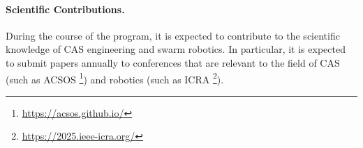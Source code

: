 \documentclass[12pt]{article}
\begin{document}
\paragraph{Scientific Contributions.}
During the course of the program, it is expected to contribute to the scientific knowledge of CAS engineering and swarm robotics. 
In particular, it is expected to submit papers annually to conferences that are relevant to the field of CAS (such as ACSOS \footnote{\url{https://acsos.github.io/}}) and robotics (such as ICRA \footnote{\url{https://2025.ieee-icra.org/}}).

\clearpage

\renewcommand{\refname}{References}



\end{document}
